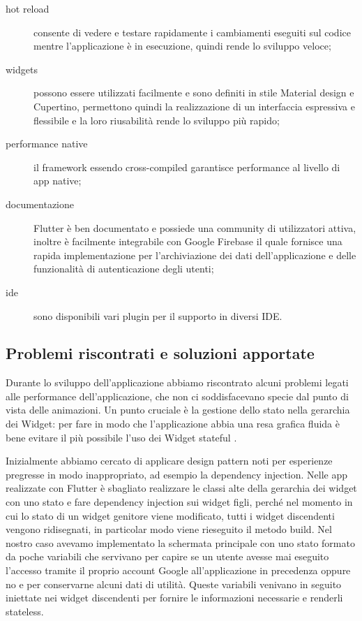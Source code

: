 \begin{description}
    \item[hot reload] consente di vedere e testare rapidamente i cambiamenti eseguiti sul codice mentre l'applicazione è in esecuzione, quindi rende lo sviluppo veloce;
    \item[widgets] possono essere utilizzati facilmente e sono definiti in stile Material design e Cupertino, permettono quindi la realizzazione di un interfaccia espressiva e flessibile e la loro riusabilità rende lo sviluppo più rapido;
    \item[performance native] il framework essendo cross-compiled garantisce performance al livello di app native;
    \item[documentazione] Flutter è ben documentato e possiede una community di utilizzatori attiva, inoltre è facilmente integrabile con Google Firebase il quale fornisce una rapida implementazione per l'archiviazione dei dati dell'applicazione e delle funzionalità di autenticazione degli utenti;
    \item[ide] sono disponibili vari plugin per il supporto in diversi IDE.
\end{description}

\subsection{Problemi riscontrati e soluzioni apportate}
Durante lo sviluppo dell'applicazione abbiamo riscontrato alcuni problemi legati alle performance dell'applicazione, che non ci soddisfacevano specie dal punto di vista delle animazioni.
Un punto cruciale è la gestione dello stato nella gerarchia dei Widget: per fare in modo che l'applicazione abbia una resa grafica fluida è bene evitare il più possibile l'uso dei Widget stateful \parencite{flutter:performance}.

Inizialmente abbiamo cercato di applicare design pattern noti per esperienze pregresse in modo inappropriato, ad esempio la dependency injection.
Nelle app realizzate con Flutter è sbagliato realizzare le classi alte della gerarchia dei widget con uno stato e fare dependency injection sui widget figli, perché nel momento in cui lo stato di un widget genitore viene modificato, tutti i widget discendenti vengono ridisegnati, in particolar modo viene rieseguito il metodo build.
Nel nostro caso avevamo implementato la schermata principale con uno stato formato da poche variabili che servivano per capire se un utente avesse mai eseguito l'accesso tramite il proprio account Google all'applicazione in precedenza oppure no e per conservarne alcuni dati di utilità.
Queste variabili venivano in seguito iniettate nei widget discendenti per fornire le informazioni necessarie e renderli stateless.


